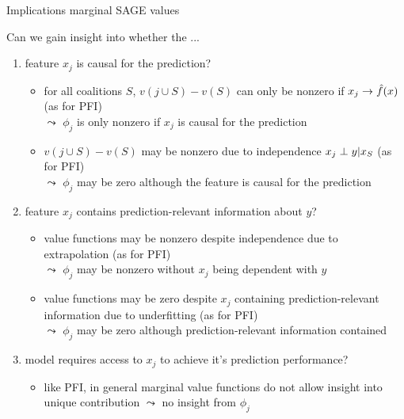 \documentclass[11pt,compress,t,notes=noshow, aspectratio=169, xcolor=table]{beamer}
\begin{document}
\begin{frame}{Implications marginal SAGE values}

Can we gain insight into whether the ...

\begin{enumerate}
    \item<1> feature $x_j$ is causal for the prediction?    \begin{itemize}
      \item for all coalitions $S$, $v(j \cup S) - v(S)$ can only be nonzero if $x_j \rightarrow \fh(x)$ (as for PFI)\\
      $\leadsto$ $\phi_j$ is only nonzero if $x_j$ is causal for the prediction
      \item $v(j \cup S) - v(S)$ may be nonzero due to independence $x_j \indep y | x_S$ (as for PFI)\\
      $\leadsto$ $\phi_j$ may be zero although the feature is causal for the prediction
    \end{itemize}
    \item<2> feature $x_j$ contains prediction-relevant information about $y$?
    \begin{itemize}
      \item value functions may be nonzero despite independence due to extrapolation (as for PFI)\\
      $\leadsto$ $\phi_j$ may be nonzero without $x_j$ being dependent with $y$
      \item value functions may be zero despite $x_j$ containing prediction-relevant information due to underfitting (as for PFI)\\
      $\leadsto$ $\phi_j$ may be zero although prediction-relevant information contained
    \end{itemize}
    \item<3> model requires access to $x_j$ to achieve it's prediction performance?    
    \begin{itemize}
      \item like PFI, in general marginal value functions do not allow insight into unique contribution $\leadsto$ no insight from $\phi_j$
    \end{itemize}
\end{enumerate}

\end{frame}
%
\end{document}
